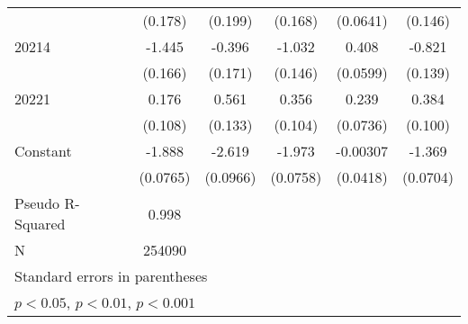 {\begin{tabular}{l*{5}{c}}
                    &     (0.178)         &     (0.199)         &     (0.168)         &    (0.0641)         &     (0.146)         \\
[1em]
20214               &      -1.445\sym{***}&      -0.396\sym{*}  &      -1.032\sym{***}&       0.408\sym{***}&      -0.821\sym{***}\\
                    &     (0.166)         &     (0.171)         &     (0.146)         &    (0.0599)         &     (0.139)         \\
[1em]
20221               &       0.176         &       0.561\sym{***}&       0.356\sym{***}&       0.239\sym{**} &       0.384\sym{***}\\
                    &     (0.108)         &     (0.133)         &     (0.104)         &    (0.0736)         &     (0.100)         \\
[1em]
Constant            &      -1.888\sym{***}&      -2.619\sym{***}&      -1.973\sym{***}&    -0.00307         &      -1.369\sym{***}\\
                    &    (0.0765)         &    (0.0966)         &    (0.0758)         &    (0.0418)         &    (0.0704)         \\
\hline
Pseudo R-Squared    &       0.998         &                     &                     &                     &                     \\
N                   &      254090         &                     &                     &                     &                     \\
\hline\hline
\multicolumn{6}{l}{\footnotesize Standard errors in parentheses}\\
\multicolumn{6}{l}{\footnotesize \sym{*} \(p<0.05\), \sym{**} \(p<0.01\), \sym{***} \(p<0.001\)}\\
\end{tabular}
}
